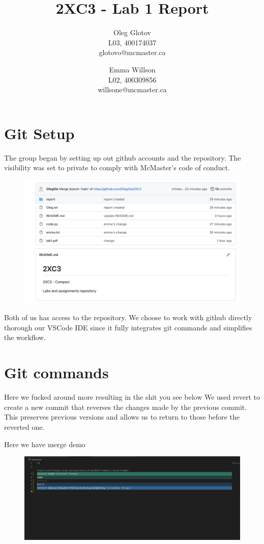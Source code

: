 \documentclass[twocolumn, 10pt]{article}
\title{2XC3 - Lab 1 Report}
\author{Oleg Glotov\\ L03, 400174037\\ glotovo@mcmaster.ca \and Emma Willson\\ L02, 400309856\\ willsone@mcmaster.ca}
\begin{document}
\maketitle
\section{Git Setup}\label{sec:git}
The group began by setting up out github accounts and the repository. The visibility was set to private to comply with McMaster's code of conduct.

\begin{figure}[H]
\includegraphics[width=\linewidth]{img1}
\end{figure}

Both of us has access to the repository. We choose to work with github directly thorough our VSCode IDE since it fully integrates git commands and simplifies the workflow.

\section{Git commands}

Here we fucked around more resulting in the shit you see below
We used revert to create a new commit that reverses the changes made by the previous commit. This preserves previous versions and allows us to return to those before the reverted one.

Here we have merge demo

\begin{figure}[H]
\includegraphics[width=\linewidth]{merge}
\end{figure}
\end{document}
